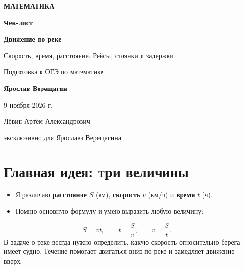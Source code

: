 \documentclass[a4paper,12pt]{article}
\newcommand{\important}[1]{\textcolor{darkaccent}{\textbf{#1}}}
\newcommand{\checkline}[1]{\item[$\square$] #1}
\begin{document}
\begin{titlepage}
\thispagestyle{empty}
\begin{center}
\vspace*{23mm}
{\small\bfseries\color{accent}\MakeUppercase{Математика}}\par
\vspace{24mm}
{\fontsize{28}{33}\selectfont\bfseries\color{darkaccent} Чек-лист}\par
\vspace{9mm}
{\fontsize{22}{27}\selectfont\bfseries Движение по реке}\par
\vspace{4mm}
{\large Скорость, время, расстояние. Рейсы, стоянки и задержки}\par
\vspace{23mm}
{\normalsize Подготовка к ОГЭ по математике}\par
\vspace{20mm}
{\Large\bfseries Ярослав Верещагин}\par
\vspace{8mm}
{\normalsize 9 ноября 2026 г.}\par
\vfill
{\normalsize\color{soft} Лёвин Артём Александрович}\par
{\normalsize\color{soft} эксклюзивно для Ярослава Верещагина}\par
\vspace{22mm}
\end{center}
\end{titlepage}
\setcounter{page}{1}

\section{Главная идея: три величины}
\begin{itemize}[label={$\square$}]
\checkline{Я различаю \important{расстояние} $S$ (км), \important{скорость} $v$ (км/ч) и \important{время} $t$ (ч).}
\checkline{Помню основную формулу и умею выразить любую величину:}
\end{itemize}
\[
\boxed{S=vt}, \qquad \boxed{t=\frac{S}{v}}, \qquad \boxed{v=\frac{S}{t}}.
\]
\noindent В задаче о реке всегда нужно определить, какую скорость относительно берега имеет судно. Течение помогает двигаться вниз по реке и замедляет движение вверх.
\end{document}
